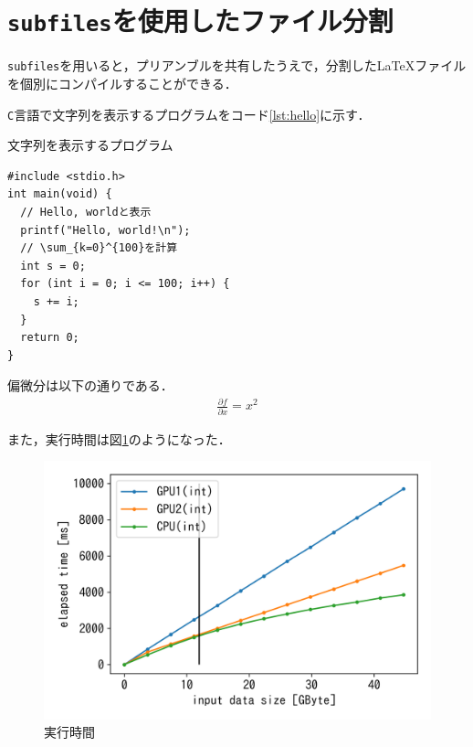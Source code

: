 \documentclass[../main]{subfiles}
\begin{document}
\section{\texttt{subfiles}を使用したファイル分割}

\texttt{subfiles}を用いると，プリアンブルを共有したうえで，分割した{\LaTeX}ファイルを個別にコンパイルすることができる．

\texttt{C}言語で文字列を表示するプログラムをコード\ref{lst:hello}に示す．

\begin{listing}[H]
\caption{文字列を表示するプログラム}
\label{lst:hello}
\begin{verbatim}
#include <stdio.h>
int main(void) {
  // Hello, worldと表示
  printf("Hello, world!\n");
  // \sum_{k=0}^{100}を計算
  int s = 0;
  for (int i = 0; i <= 100; i++) {
    s += i;
  }
  return 0;
}
\end{verbatim}
\end{listing}

偏微分は以下の通りである．
\begin{eqnarray}
  \frac{\partial f}{\partial x} = x ^ 2
\end{eqnarray}

また，実行時間は図\ref{fig:elapsed}のようになった．
\begin{figure}[H]
  \centering
  \includegraphics[width=0.8\linewidth]{figures/plt_merge_elapsed2_docker.png}
  \caption{実行時間}
  \label{fig:elapsed}
\end{figure}
\end{document}
